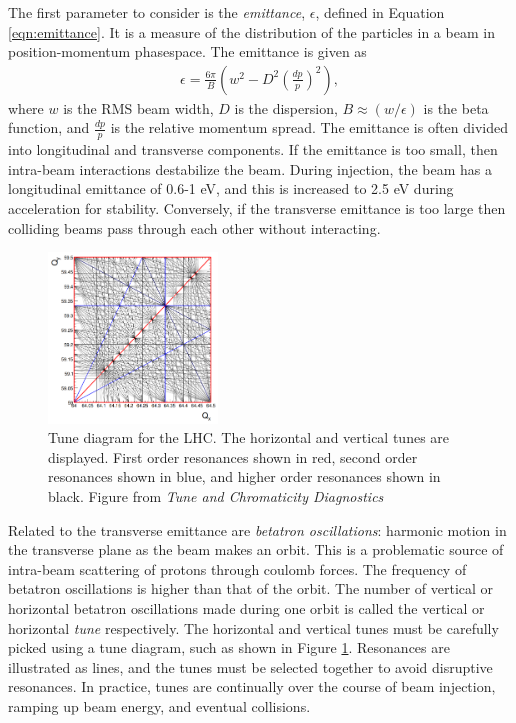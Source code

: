 The first parameter to consider is the \emph{emittance}, $\epsilon$, defined in Equation \ref{eqn:emittance}.
It is a measure of the distribution of the particles in a beam in position-momentum phasespace.
The emittance is given as
\begin{equation}\begin{split}\label{eqn:emittance}
\epsilon = \frac{6\pi}{B}(w^2-D^2(\frac{dp}{p})^2),
\end{split}\end{equation} 
where $w$ is the RMS beam width, $D$ is the dispersion, $B\approx(w/\epsilon)$ is the beta function, and $\frac{dp}{p}$ is the relative momentum spread.
The emittance is often divided into longitudinal and transverse components.
If the emittance is too small, then intra-beam interactions destabilize the beam. 
During injection, the beam has a longitudinal emittance of 0.6-1 eV, and this is increased to 2.5 eV during acceleration for stability.
Conversely, if the transverse emittance is too large then colliding beams pass through each other without interacting.
\cite{boussard}\cite{lyndon}\cite{pdgAccelSection}

\begin{figure}[h!]
\captionsetup[subfigure]{position=b}
\centering
\includegraphics[width=0.4\textwidth]{figures/experiment/tune.png}
\caption{Tune diagram for the LHC. The horizontal and vertical tunes are displayed. First order resonances shown in red, second order resonances shown in blue, and higher order resonances shown in black. Figure from \emph{Tune and Chromaticity Diagnostics} \cite{steinhagen}}
\label{fig:tune}
\end{figure}

Related to the transverse emittance are \emph{betatron oscillations}: harmonic motion in the transverse plane as the beam makes an orbit.\cite{pdgAccelSection}
This is a problematic source of intra-beam scattering of protons through coulomb forces.
The frequency of betatron oscillations is higher than that of the orbit.
The number of vertical or horizontal betatron oscillations made during one orbit is called the vertical or horizontal \emph{tune} respectively.
The horizontal and vertical tunes must be carefully picked using a tune diagram, such as shown in Figure \ref{fig:tune}.
Resonances are illustrated as lines, and the tunes must be selected together to avoid disruptive resonances.
In practice, tunes are continually over the course of beam injection, ramping up beam energy, and eventual collisions.

